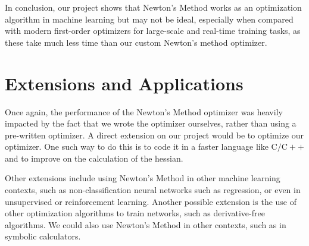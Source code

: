 \documentclass[10pt]{article}
\begin{document}
In conclusion, our project shows that Newton's Method works as an optimization algorithm in machine learning but may not be ideal, especially when compared with modern first-order optimizers for large-scale and real-time training tasks, as these take much less time than our custom Newton's method optimizer.

\section*{Extensions and Applications}
Once again, the performance of the Newton's Method optimizer was heavily impacted by the fact that we wrote the optimizer ourselves, rather than using a pre-written optimizer. A direct extension on our project would be to optimize our optimizer. One such way to do this is to code it in a faster language like $\mathrm{C} / \mathrm{C}++$ and to improve on the calculation of the hessian.

Other extensions include using Newton's Method in other machine learning contexts, such as non-classification neural networks such as regression, or even in unsupervised or reinforcement learning. Another possible extension is the use of other optimization algorithms to train networks, such as derivative-free algorithms. We could also use Newton's Method in other contexts, such as in symbolic calculators.



\end{document}

